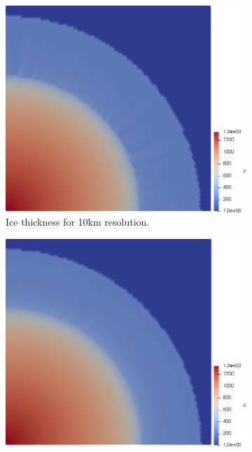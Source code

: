 \documentclass{article}
\begin{document}
\begin{figure}[!h]
	\centering %
	\begin{minipage}[t]{.25\textwidth}
		\begin{subfigure}{\textwidth}
			\includegraphics[width=\linewidth]{../fig/h_10km_quarter.png}
			\caption{Ice thickness for 10km resolution.}
			\label{h10km}
		\end{subfigure}\hfil %
		\begin{subfigure}{\textwidth}
			\includegraphics[width=\linewidth]{../fig/h_5km_quarter.png}

\end{subfigure}
\end{minipage}
\end{figure}
\end{document}
